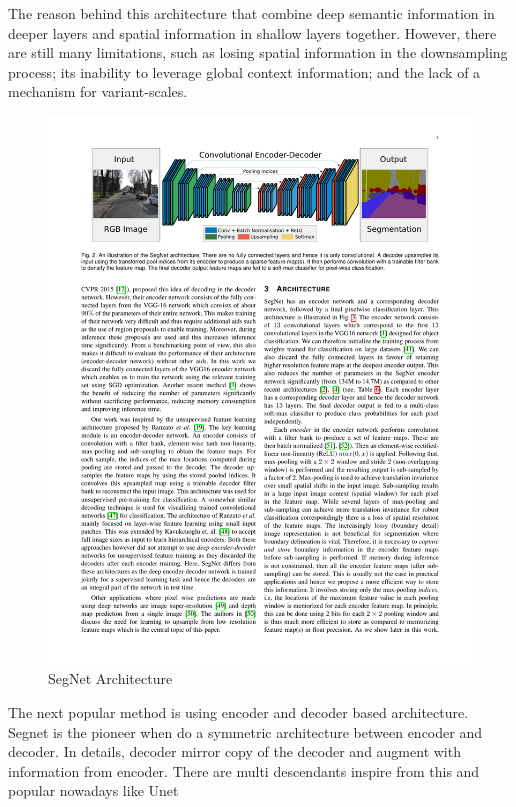 The reason behind this architecture that combine deep semantic information in deeper layers and spatial information in shallow layers together. However, there are still many limitations, such as losing spatial information in the downsampling process; its inability to leverage global context information; and the lack of a mechanism for variant-scales.

\begin{figure}[h]
    \centering
    \includegraphics[width=\textwidth]{content/resources/new_images/related_works/segnet.pdf}
    \caption{SegNet Architecture}
    \label{fig:segnet}
\end{figure}

The next popular method is using encoder and decoder based architecture. Segnet\cite{segnet} is the pioneer when do a symmetric architecture between encoder and decoder. In details, decoder mirror copy of the decoder and augment with information from encoder. There are multi descendants inspire from this and popular nowadays like Unet\cite{Unet}

